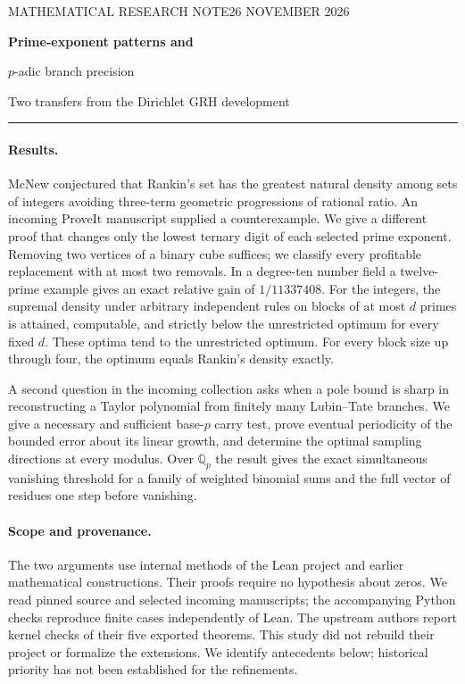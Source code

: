 \documentclass[11pt]{article}
\begin{document}
\thispagestyle{plain}
{\small\sffamily\color{inkblue} MATHEMATICAL RESEARCH NOTE\hfill 26 NOVEMBER 2026}\par\vspace{.5em}
{\Huge\bfseries Prime-exponent patterns and\par $p$-adic branch precision}\par\vspace{.6em}
{\Large Two transfers from the Dirichlet GRH development}\par\vspace{.7em}
\noindent\rule{\linewidth}{.65pt}
\paragraph{Results.}
McNew conjectured that Rankin's set has the greatest natural density among sets of integers avoiding three-term geometric progressions of rational ratio. An incoming ProveIt manuscript supplied a counterexample. We give a different proof that changes only the lowest ternary digit of each selected prime exponent. Removing two vertices of a binary cube suffices; we classify every profitable replacement with at most two removals. In a degree-ten number field a twelve-prime example gives an exact relative gain of $1/11337408$. For the integers, the supremal density under arbitrary independent rules on blocks of at most $d$ primes is attained, computable, and strictly below the unrestricted optimum for every fixed $d$. These optima tend to the unrestricted optimum. For every block size up through four, the optimum equals Rankin's density exactly.

A second question in the incoming collection asks when a pole bound is sharp in reconstructing a Taylor polynomial from finitely many Lubin--Tate branches. We give a necessary and sufficient base-$p$ carry test, prove eventual periodicity of the bounded error about its linear growth, and determine the optimal sampling directions at every modulus. Over $\mathbb Q_p$ the result gives the exact simultaneous vanishing threshold for a family of weighted binomial sums and the full vector of residues one step before vanishing.

\paragraph{Scope and provenance.}
The two arguments use internal methods of the Lean project and earlier mathematical constructions. Their proofs require no hypothesis about zeros. We read pinned source and selected incoming manuscripts; the accompanying Python checks reproduce finite cases independently of Lean. The upstream authors report kernel checks of their five exported theorems. This study did not rebuild their project or formalize the extensions. We identify antecedents below; historical priority has not been established for the refinements.
\end{document}
